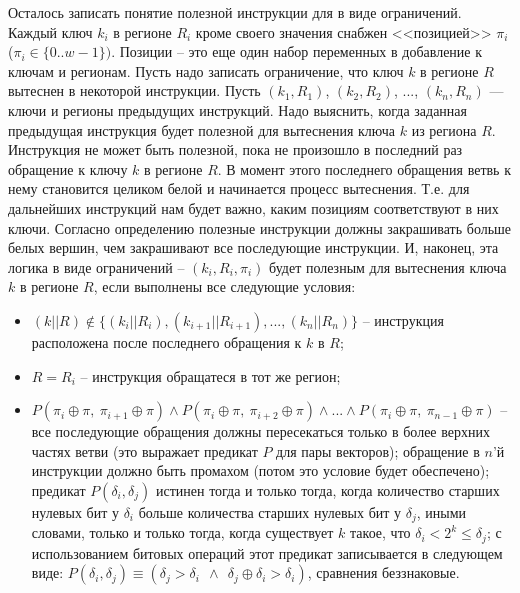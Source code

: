 Осталось записать понятие полезной инструкции для \PseudoLRU в виде
ограничений. Каждый ключ $k_i$ в регионе $R_i$ кроме своего значения
снабжен <<позицией>> $\pi_i$ ($\pi_i \in \{0..w{-}1\})$. Позиции -- это еще один
набор переменных в добавление к ключам и регионам. Пусть надо записать
ограничение, что ключ $k$ в регионе $R$ вытеснен в некоторой инструкции. Пусть
$(k_1, R_1)$, $(k_2, R_2)$, ..., $(k_n, R_n)$ --- ключи и регионы предыдущих
инструкций. Надо выяснить, когда заданная предыдущая инструкция будет полезной
для вытеснения ключа $k$ из региона $R$. Инструкция не может быть полезной, пока
не произошло в последний раз обращение к ключу $k$ в регионе $R$. В момент этого
последнего обращения ветвь к нему становится целиком белой и начинается процесс
вытеснения. Т.е. для дальнейших инструкций нам будет важно, каким позициям
соответствуют в них ключи. Согласно определению полезные инструкции должны
закрашивать больше белых вершин, чем закрашивают все последующие инструкции. И,
наконец, эта логика в виде ограничений -- $(k_i, R_i, \pi_i)$ будет полезным для
вытеснения ключа $k$ в регионе $R$, если выполнены все следующие условия:
\begin{itemize}
    \item $(k||R) \notin \{(k_i||R_i), (k_{i+1}||R_{i+1}), ..., (k_n||R_n)\}$ --
инструкция расположена после последнего обращения к $k$ в $R$;
    \item $R = R_i$ -- инструкция обращатеся в тот же регион;
    \item $P(\pi_i \oplus \pi,~\pi_{i+1} \oplus \pi) \wedge P(\pi_i \oplus
\pi,~\pi_{i+2} \oplus \pi) \wedge ... \wedge P(\pi_i \oplus \pi,~\pi_{n-1}
\oplus \pi)$ -- все последующие обращения должны пересекаться только в более
верхних частях ветви (это выражает предикат $P$ для пары векторов); обращение в
$n$'й инструкции должно быть промахом (потом это условие будет обеспечено);
предикат $P(\delta_i, \delta_j)$ истинен тогда и только тогда, когда количество
старших нулевых бит у $\delta_i$ больше количества старших нулевых бит у
$\delta_j$, иными словами, только и только тогда, когда существует $k$ такое,
что $\delta_i < 2^k \leqslant \delta_j$; с использованием битовых операций этот
предикат записывается в следующем виде: $P(\delta_i, \delta_j) \equiv
(\delta_j > \delta_i~~\wedge~~\delta_j \oplus \delta_i > \delta_i)$, сравнения
беззнаковые.
\end{itemize}

